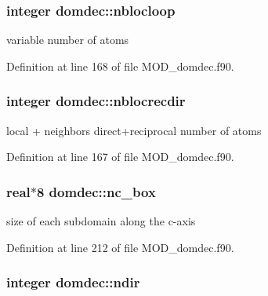 \hypertarget{classdomdec_a597fdf38e68a3e3e120320f814fcc12e}{
\subsubsection[{nblocloop}]{\setlength{\rightskip}{0pt plus 5cm}integer domdec\-::nblocloop}}\label{classdomdec_a597fdf38e68a3e3e120320f814fcc12e}


variable number of atoms 



Definition at line 168 of file M\-O\-D\-\_\-domdec.\-f90.

\hypertarget{classdomdec_aba62c8c31213bb0025d171e5e2adb210}{
\subsubsection[{nblocrecdir}]{\setlength{\rightskip}{0pt plus 5cm}integer domdec\-::nblocrecdir}}\label{classdomdec_aba62c8c31213bb0025d171e5e2adb210}


local + neighbors direct+reciprocal number of atoms 



Definition at line 167 of file M\-O\-D\-\_\-domdec.\-f90.

\hypertarget{classdomdec_a9fd61bdb5b4eba47980730d881363787}{
\subsubsection[{nc\-\_\-box}]{\setlength{\rightskip}{0pt plus 5cm}real$\ast$8 domdec\-::nc\-\_\-box}}\label{classdomdec_a9fd61bdb5b4eba47980730d881363787}


size of each subdomain along the c-\/axis 



Definition at line 212 of file M\-O\-D\-\_\-domdec.\-f90.

\hypertarget{classdomdec_ae5edf3757894f9397d3d4f603eb2d076}{
\subsubsection[{ndir}]{\setlength{\rightskip}{0pt plus 5cm}integer domdec\-::ndir}}\label{classdomdec_ae5edf3757894f9397d3d4f603eb2d076}


